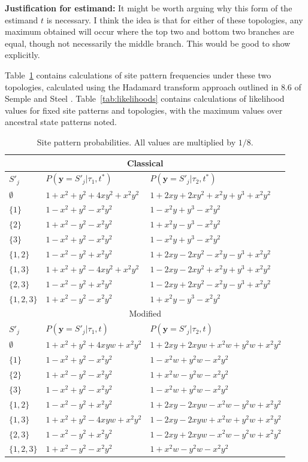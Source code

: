 \documentclass[a4paper]{article}
\newcommand{\alignmentColumn}{\mathbf{y}}
\newcommand{\siteSplit}{S'}
\begin{document}
\textbf{Justification for estimand:} It might be worth arguing why this form of the estimand $t$ is necessary.
I think the idea is that for either of these topologies, any maximum obtained will occur where the top two and bottom two branches are equal, though not necessarily the middle branch.
This would be good to show explicitly.

Table~\ref{tab:sitepatprob} contains calculations of site pattern frequencies under these two topologies, calculated using the Hadamard transform approach outlined in 8.6 of Semple and Steel \cite{Semple2003-em}.
Table~\ref{tab:likelihoods} contains calculations of likelihood values for fixed site patterns and topologies, with the maximum values over ancestral state patterns noted.

\begin{table}
\centering
\begin{tabular}{|l|l|l|}
\multicolumn{3}{c}{Classical}\\
    \hline
$\siteSplit_j$   &$P(\alignmentColumn=\siteSplit_j|\tau_1,t^*)$&$P(\alignmentColumn=\siteSplit_j|\tau_2,t^*)$\\
    \hline
    $\emptyset$&$1+x^2+y^2+4xy^2+x^2y^2$&$1+2xy+2xy^2+x^2y+y^3+x^2y^2$\\
    $\{1\}$    &$1-x^2+y^2-x^2y^2$&$1-x^2y+y^3-x^2y^2$\\
    $\{2\}$    &$1+x^2-y^2-x^2y^2$&$1+x^2y-y^3-x^2y^2$\\
    $\{3\}$    &$1-x^2+y^2-x^2y^2$&$1-x^2y+y^3-x^2y^2$\\
    $\{1,2\}$  &$1-x^2-y^2+x^2y^2$&$1+2xy-2xy^2-x^2y-y^3+x^2y^2$\\
    $\{1,3\}$  &$1+x^2+y^2-4xy^2+x^2y^2$&$1-2xy-2xy^2+x^2y+y^3+x^2y^2$\\
    $\{2,3\}$  &$1-x^2-y^2+x^2y^2$&$1-2xy+2xy^2-x^2y-y^3+x^2y^2$\\
    $\{1,2,3\}$&$1+x^2-y^2-x^2y^2$&$1+x^2y-y^3-x^2y^2$\\
    \hline
\multicolumn{3}{c}{Modified}\\
    \hline
$\siteSplit_j$   &$P(\alignmentColumn=\siteSplit_j|\tau_1,t)$&$P(\alignmentColumn=\siteSplit_j|\tau_2,t)$\\
    \hline
    $\emptyset$&$1+x^2+y^2+4xyw+x^2y^2$&$1+2xy+2xyw+x^2w+y^2w+x^2y^2$\\
    $\{1\}$    &$1-x^2+y^2-x^2y^2$&$1-x^2w+y^2w-x^2y^2$\\
    $\{2\}$    &$1+x^2-y^2-x^2y^2$&$1+x^2w-y^2w-x^2y^2$\\
    $\{3\}$    &$1-x^2+y^2-x^2y^2$&$1-x^2w+y^2w-x^2y^2$\\
    $\{1,2\}$  &$1-x^2-y^2+x^2y^2$&$1+2xy-2xyw-x^2w-y^2w+x^2y^2$\\
    $\{1,3\}$  &$1+x^2+y^2-4xyw+x^2y^2$&$1-2xy-2xyw+x^2w+y^2w+x^2y^2$\\
    $\{2,3\}$  &$1-x^2-y^2+x^2y^2$&$1-2xy+2xyw-x^2w-y^2w+x^2y^2$\\
    $\{1,2,3\}$&$1+x^2-y^2-x^2y^2$&$1+x^2w-y^2w-x^2y^2$\\
    \hline
\end{tabular}
\caption{Site pattern probabilities.
All values are multiplied by $1/8$.}
\label{tab:sitepatprob}
\end{table}
\end{document}
